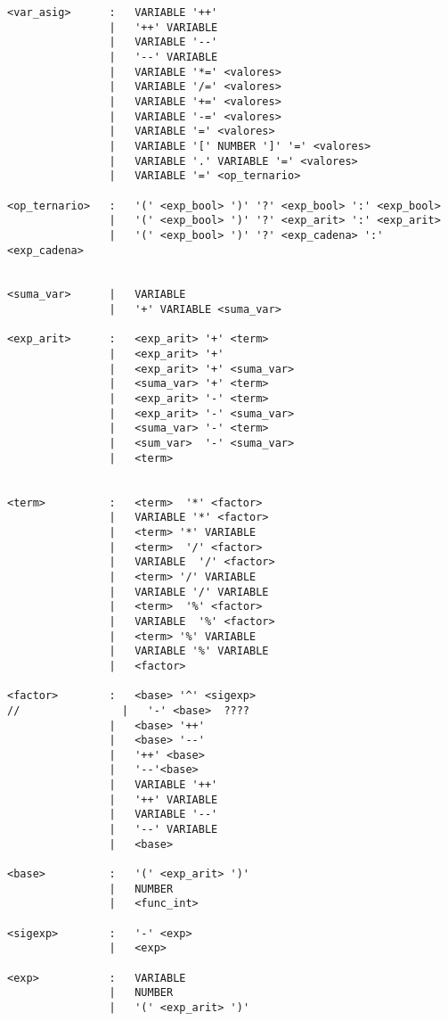 \begin{verbatim}
<var_asig>      :   VARIABLE '++'
                |   '++' VARIABLE
                |   VARIABLE '--'
                |   '--' VARIABLE
                |   VARIABLE '*=' <valores>
                |   VARIABLE '/=' <valores>
                |   VARIABLE '+=' <valores>
                |   VARIABLE '-=' <valores>
                |   VARIABLE '=' <valores>
                |   VARIABLE '[' NUMBER ']' '=' <valores>
                |   VARIABLE '.' VARIABLE '=' <valores>
                |   VARIABLE '=' <op_ternario>

<op_ternario>   :   '(' <exp_bool> ')' '?' <exp_bool> ':' <exp_bool>
                |   '(' <exp_bool> ')' '?' <exp_arit> ':' <exp_arit>
                |   '(' <exp_bool> ')' '?' <exp_cadena> ':' <exp_cadena>


<suma_var>      |   VARIABLE
                |   '+' VARIABLE <suma_var>

<exp_arit>      :   <exp_arit> '+' <term>
                |   <exp_arit> '+' 
                |   <exp_arit> '+' <suma_var>
                |   <suma_var> '+' <term>
                |   <exp_arit> '-' <term>
                |   <exp_arit> '-' <suma_var>
                |   <suma_var> '-' <term>
                |   <sum_var>  '-' <suma_var>
                |   <term>


<term>          :   <term>  '*' <factor>
                |   VARIABLE '*' <factor>
                |   <term> '*' VARIABLE
                |   <term>  '/' <factor>
                |   VARIABLE  '/' <factor>
                |   <term> '/' VARIABLE
                |   VARIABLE '/' VARIABLE
                |   <term>  '%' <factor>
                |   VARIABLE  '%' <factor>
                |   <term> '%' VARIABLE
                |   VARIABLE '%' VARIABLE
                |   <factor>

<factor>        :   <base> '^' <sigexp>
//                |   '-' <base>  ????
                |   <base> '++'
                |   <base> '--'
                |   '++' <base>
                |   '--'<base>
                |   VARIABLE '++'
                |   '++' VARIABLE
                |   VARIABLE '--'
                |   '--' VARIABLE
                |   <base>

<base>          :   '(' <exp_arit> ')'
                |   NUMBER
                |   <func_int>

<sigexp>        :   '-' <exp>
                |   <exp>

<exp>           :   VARIABLE
                |   NUMBER
                |   '(' <exp_arit> ')'


\end{verbatim}
